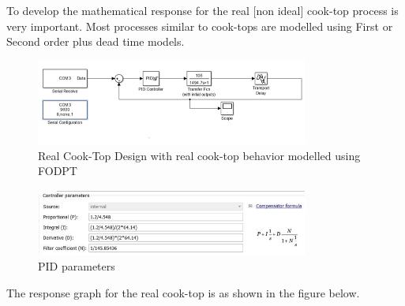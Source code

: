
To develop the mathematical response for the real [non ideal] cook-top process is very important. Most processes similar to cook-tops are modelled using First or Second order plus dead time models.

\begin{figure}[ht!]
	\centering
	\includegraphics[width=0.8\textwidth, height=0.2\textheight]{images/hw_6.png}
	\caption{Real Cook-Top Design with real cook-top behavior modelled using FODPT \label{hw_6}}
\end{figure}

\begin{figure}[ht!]
	\centering
	\includegraphics[width=0.8\textwidth, height=0.2\textheight]{images/hw_7.png}
	\caption{PID parameters \label{hw_7}}
\end{figure}

The response graph for the real cook-top is as shown in the figure below.







